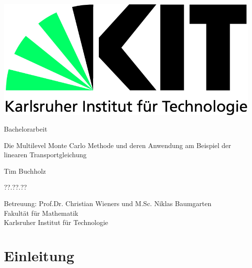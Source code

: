 \documentclass[12pt,a4paper]{scrartcl}
\numberwithin{equation}{section}
\begin{document}
  \pagestyle{empty}
  
  
  \begin{titlepage}

    \includegraphics[scale=0.45]{kit-logo.jpg} 
    \vspace*{2cm} 

 \begin{center} \large 
    
    Bachelorarbeit
    \vspace*{2cm}

    {\huge Die Multilevel Monte Carlo Methode und deren Anwendung am Beispiel der linearen Transportgleichung}
    \vspace*{2.5cm}

    Tim Buchholz
    \vspace*{1.5cm}

    ??.??.??
    \vspace*{4.5cm}


    Betreuung: Prof.Dr. Christian Wieners und M.Sc. Niklas Baumgarten \\[1cm]
    Fakultät für Mathematik \\[1cm]
		Karlsruher Institut für Technologie
  \end{center}
\end{titlepage}



  \tableofcontents

\newpage
 


  \pagestyle{headings}

\section{Einleitung}
\end{document}
